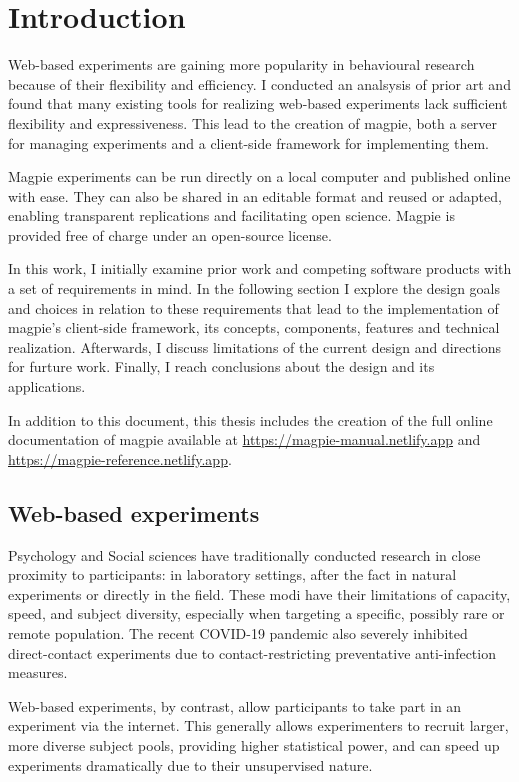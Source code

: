 \documentclass[a4paper,11pt]{scrreprt}
\begin{document}
\tableofcontents
\newpage 


\chapter{Introduction}
Web-based experiments are gaining more popularity in behavioural research because of their flexibility and efficiency. I conducted an analsysis of prior art and found that many existing tools for realizing web-based experiments lack sufficient flexibility and expressiveness. This lead to the creation of magpie, both a server for managing experiments and a client-side framework for implementing them.

Magpie experiments can be run directly on a local computer and published online with ease. They can also be shared in an editable format and reused or adapted, enabling transparent replications and facilitating open science. Magpie is provided free of charge under an open-source license.

In this work, I initially examine prior work and competing software products with a set of requirements in mind. In the following section I explore the design goals and choices in relation to these requirements that lead to the implementation of magpie's client-side framework, its concepts, components, features and technical realization. Afterwards, I discuss limitations of the current design and directions for furture work. Finally, I reach conclusions about the design and its applications.

In addition to this document, this thesis includes the creation of the full online documentation of magpie available at \url{https://magpie-manual.netlify.app} and \url{https://magpie-reference.netlify.app}.

\section{Web-based experiments}
Psychology and Social sciences have traditionally conducted research in close proximity to participants: in laboratory settings, after the fact in natural experiments or directly in the field. These modi have their limitations of capacity, speed, and subject diversity, especially when targeting a specific, possibly rare or remote population. The recent COVID-19 pandemic also severely inhibited direct-contact experiments due to contact-restricting preventative anti-infection measures.

Web-based experiments, by contrast, allow participants to take part in an experiment via the internet. This generally allows experimenters to recruit larger, more diverse subject pools, providing higher statistical power, and can speed up experiments dramatically due to their unsupervised nature.
\end{document}
